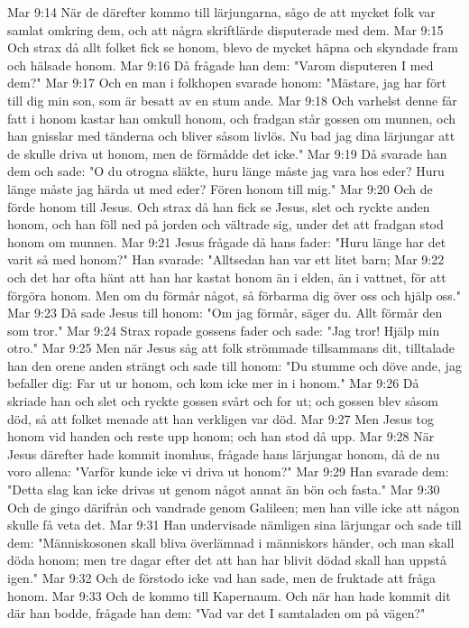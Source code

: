 Mar 9:14  När de därefter kommo till lärjungarna, sågo de att mycket folk var samlat omkring dem, och att några skriftlärde disputerade med dem.
Mar 9:15  Och strax då allt folket fick se honom, blevo de mycket häpna och skyndade fram och hälsade honom.
Mar 9:16  Då frågade han dem: "Varom disputeren I med dem?"
Mar 9:17  Och en man i folkhopen svarade honom: "Mästare, jag har fört till dig min son, som är besatt av en stum ande.
Mar 9:18  Och varhelst denne får fatt i honom kastar han omkull honom, och fradgan står gossen om munnen, och han gnisslar med tänderna och bliver såsom livlös. Nu bad jag dina lärjungar att de skulle driva ut honom, men de förmådde det icke."
Mar 9:19  Då svarade han dem och sade: "O du otrogna släkte, huru länge måste jag vara hos eder? Huru länge måste jag härda ut med eder? Fören honom till mig."
Mar 9:20  Och de förde honom till Jesus. Och strax då han fick se Jesus, slet och ryckte anden honom, och han föll ned på jorden och vältrade sig, under det att fradgan stod honom om munnen.
Mar 9:21  Jesus frågade då hans fader: "Huru länge har det varit så med honom?" Han svarade: "Alltsedan han var ett litet barn;
Mar 9:22  och det har ofta hänt att han har kastat honom än i elden, än i vattnet, för att förgöra honom. Men om du förmår något, så förbarma dig över oss och hjälp oss."
Mar 9:23  Då sade Jesus till honom: "Om jag förmår, säger du. Allt förmår den som tror."
Mar 9:24  Strax ropade gossens fader och sade: "Jag tror! Hjälp min otro."
Mar 9:25  Men när Jesus såg att folk strömmade tillsammans dit, tilltalade han den orene anden strängt och sade till honom: "Du stumme och döve ande, jag befaller dig: Far ut ur honom, och kom icke mer in i honom."
Mar 9:26  Då skriade han och slet och ryckte gossen svårt och for ut; och gossen blev såsom död, så att folket menade att han verkligen var död.
Mar 9:27  Men Jesus tog honom vid handen och reste upp honom; och han stod då upp.
Mar 9:28  När Jesus därefter hade kommit inomhus, frågade hans lärjungar honom, då de nu voro allena: "Varför kunde icke vi driva ut honom?"
Mar 9:29  Han svarade dem: "Detta slag kan icke drivas ut genom något annat än bön och fasta."
Mar 9:30  Och de gingo därifrån och vandrade genom Galileen; men han ville icke att någon skulle få veta det.
Mar 9:31  Han undervisade nämligen sina lärjungar och sade till dem: "Människosonen skall bliva överlämnad i människors händer, och man skall döda honom; men tre dagar efter det att han har blivit dödad skall han uppstå igen."
Mar 9:32  Och de förstodo icke vad han sade, men de fruktade att fråga honom.
Mar 9:33  Och de kommo till Kapernaum. Och när han hade kommit dit där han bodde, frågade han dem: "Vad var det I samtaladen om på vägen?"
